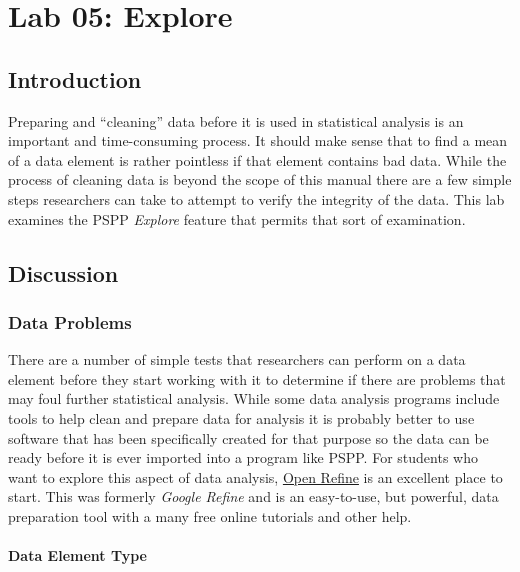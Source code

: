 \chapter{Lab 05: Explore}\label{ch:lab05}

\section{Introduction}

Preparing and ``cleaning'' data before it is used in statistical analysis is an important and time-consuming process. It should make sense that to find a mean of a data element is rather pointless if that element contains bad data. While the process of cleaning data is beyond the scope of this manual there are a few simple steps researchers can take to attempt to verify the integrity of the data. This lab examines the \acs{PSPP} \textit{Explore} feature that permits that sort of examination.

\section{Discussion}

\subsection{Data Problems}

There are a number of simple tests that researchers can perform on a data element before they start working with it to determine if there are problems that may foul further statistical analysis. While some data analysis programs include tools to help clean and prepare data for analysis it is probably better to use software that has been specifically created for that purpose so the data can be ready before it is ever imported into a program like \acs{PSPP}. For students who want to explore this aspect of data analysis, \href{http://openrefine.org/}{Open Refine} is an excellent place to start. This was formerly \textit{Google Refine} and is an easy-to-use, but powerful, data preparation tool with a many free online tutorials and other help.

\subsubsection{Data Element Type}

